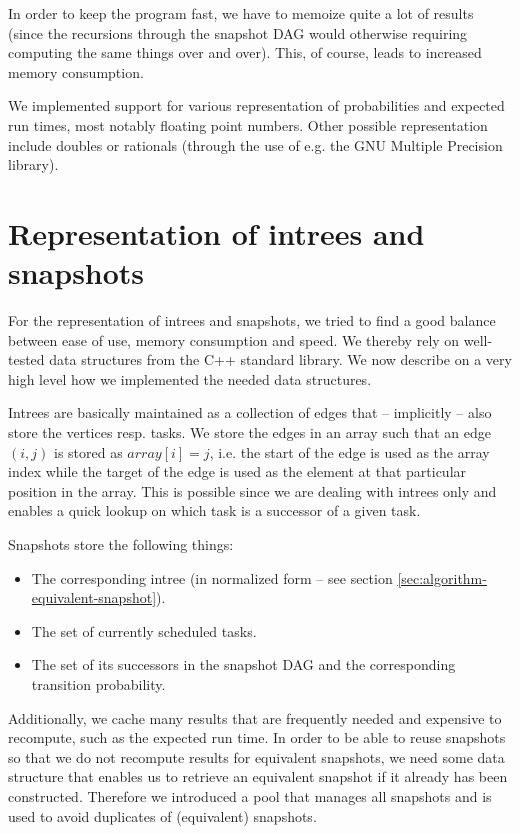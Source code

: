 In order to keep the program fast, we have to memoize quite a lot of results (since the recursions through the snapshot DAG would otherwise requiring computing the same things over and over). This, of course, leads to increased memory consumption.

\label{sec:implementation-numbers}
We implemented support for various representation of probabilities and expected run times, most notably floating point numbers. Other possible representation include doubles or rationals (through the use of e.g. the GNU Multiple Precision library).

\section{Representation of intrees and snapshots}
\label{sec:implementation-repr-intrees-snapshots}

For the representation of intrees and snapshots, we tried to find a good balance between ease of use, memory consumption and speed. We thereby rely on well-tested data structures from the C++ standard library. We now describe on a very high level how we implemented the needed data structures.

Intrees are basically maintained as a collection of edges that -- implicitly -- also store the vertices resp. tasks. We store the edges in an array such that an edge $(i,j)$ is stored as $array[i]=j$, i.e. the start of the edge is used as the array index while the target of the edge is used as the element at that particular position in the array. This is possible since we are dealing with intrees only and enables a quick lookup on which task is a successor of a given task.

Snapshots store the following things:
\begin{itemize}
\item The corresponding intree (in normalized form -- see section \ref{sec:algorithm-equivalent-snapshot}).
\item The set of currently scheduled tasks.
\item The set of its successors in the snapshot DAG and the corresponding transition probability.
\end{itemize}

Additionally, we cache many results that are frequently needed and expensive to recompute, such as the expected run time. In order to be able to reuse snapshots so that we do not recompute results for equivalent snapshots, we need some data structure that enables us to retrieve an equivalent snapshot if it already has been constructed. Therefore we introduced a pool that manages all snapshots and is used to avoid duplicates of (equivalent) snapshots.

